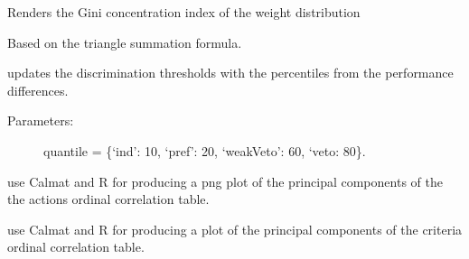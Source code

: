 \documentclass[letterpaper,10pt,english]{sphinxmanual}
\begin{document}
\begin{fulllineitems}
\begin{fulllineitems}
\label{techDoc:outrankingDigraphs.OutrankingDigraph.computeWeightsConcentrationIndex}
Renders the Gini concentration index of the weight distribution

Based on the triangle summation formula.

\end{fulllineitems}


\begin{fulllineitems}
\label{techDoc:outrankingDigraphs.OutrankingDigraph.defaultDiscriminationThresholds}
updates the discrimination thresholds with the percentiles
from the performance differences.
\begin{description}
\item[{Parameters:}] \leavevmode
quantile = \{`ind': 10, `pref': 20, `weakVeto': 60, `veto: 80\}.

\end{description}

\end{fulllineitems}


\begin{fulllineitems}
\label{techDoc:outrankingDigraphs.OutrankingDigraph.export3DplotOfActionsCorrelation}
use Calmat and R for producing a png plot of the principal components of
the the actions ordinal correlation table.

\end{fulllineitems}


\begin{fulllineitems}
\label{techDoc:outrankingDigraphs.OutrankingDigraph.export3DplotOfCriteriaCorrelation}
use Calmat and R for producing a plot of the principal components of
the criteria ordinal correlation table.


\end{fulllineitems}
\end{fulllineitems}
\end{document}
